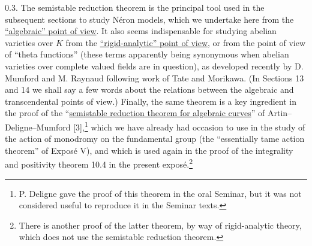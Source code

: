 0.3. The semistable reduction theorem is the principal tool used in the
subsequent sections to study N\'eron models, which we undertake here
from the \underline{``algebraic'' point of view}. It also seems
indispensable for studying abelian varieties over $K$ from the
\underline{``rigid-analytic'' point of view}, or from the point of view
of ``theta functions'' (these terms apparently being synonymous when
abelian varieties over complete valued fields are in question), as
developed recently by D. Mumford and M. Raynaud following work of Tate
and Morikawa. (In Sections 13 and 14 we shall say a few words about the
relations between the algebraic and transcendental points of view.)
Finally, the same theorem is a key ingredient in the proof of the
``\underline{semistable reduction theorem for algebraic curves}'' of
Artin--Deligne--Mumford [3],\footnote{P. Deligne gave the proof of this
theorem in the oral Seminar, but it was not considered useful to
reproduce it in the Seminar texts.} which we have already had occasion
to use in the study of the action of monodromy on the fundamental group
(the ``essentially tame action theorem'' of Expos\'e V), and which is
used again in the proof of the integrality and positivity theorem 10.4
in the present expos\'e.\footnote{There is another proof of the latter
theorem, by way of rigid-analytic theory, which does not use the
semistable reduction theorem.}


